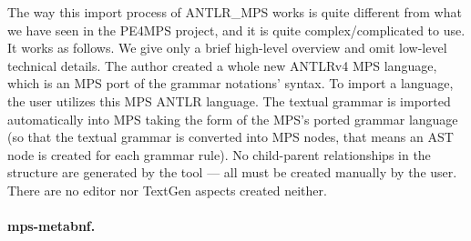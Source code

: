 The way this import process of ANTLR{\_}MPS works is quite different from what we have seen in the PE4MPS project, and it is quite complex/complicated to use.
It works as follows. We give only a brief high-level overview and omit low-level technical details.
The author created a whole new ANTLRv4 MPS language, which is an MPS port of the grammar notations' syntax.
To import a language, the user utilizes this MPS ANTLR language.
The textual grammar is imported automatically into MPS taking the form of the MPS's ported grammar language (so that the textual grammar is converted into MPS nodes, that means an AST node is created for each grammar rule).
No child-parent relationships in the structure are generated by the tool --- all must be created manually by the user.
There are no editor nor TextGen aspects created neither.

\paragraph{mps-metabnf.}
